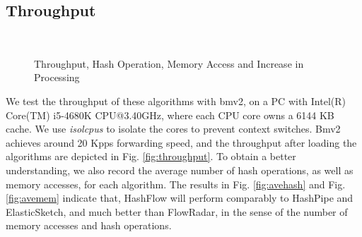 \subsection{Throughput}
\label{subsec:throughput}
\begin{figure}[ht!]
	\centering
	\mbox{
	}
	\caption{Throughput, Hash Operation, Memory Access and Increase in Processing}
	\label{throughput}
\end{figure}
We test the throughput of these algorithms with bmv2, 
on a PC with Intel(R) Core(TM) i5-4680K CPU@3.40GHz, 
where each CPU core owns a 6144 KB cache. 
We  use \emph{isolcpus} to isolate the cores to prevent context switches.
Bmv2 achieves around 20 Kpps forwarding speed, 
and the throughput after loading the algorithms are depicted in Fig. \ref{fig:throughput}.
To obtain a better understanding, we also record the average number of 
hash operations, as well as memory accesses, for each algorithm. 
The  results in Fig. \ref{fig:avehash} and Fig. \ref{fig:avemem} indicate that, 
HashFlow will perform comparably to HashPipe and ElasticSketch, 
and much better than FlowRadar, in the sense of the number of memory accesses and hash operations.

